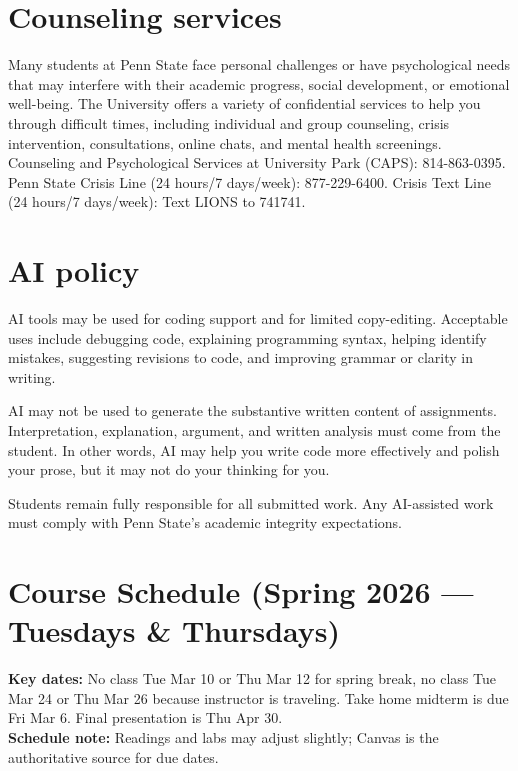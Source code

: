 \documentclass[letterpaper,11pt]{article}
\begin{document}
\section*{Counseling services}
Many students at Penn State face personal challenges or have psychological needs that may interfere with their academic progress, social development, or emotional well-being. The University offers a variety of confidential services to help you through difficult times, including individual and group counseling, crisis intervention, consultations, online chats, and mental health screenings. Counseling and Psychological Services at University Park (CAPS): 814-863-0395. Penn State Crisis Line (24 hours/7 days/week): 877-229-6400. Crisis Text Line (24 hours/7 days/week): Text LIONS to 741741.

\section*{AI policy}
AI tools may be used for coding support and for limited copy-editing. Acceptable uses include debugging code, explaining programming syntax, helping identify mistakes, suggesting revisions to code, and improving grammar or clarity in writing.\bigskip

\noindent AI may not be used to generate the substantive written content of assignments. Interpretation, explanation, argument, and written analysis must come from the student. In other words, AI may help you write code more effectively and polish your prose, but it may not do your thinking for you.\bigskip

\noindent Students remain fully responsible for all submitted work. Any AI-assisted work must comply with Penn State’s academic integrity expectations.


\section*{Course Schedule (Spring 2026 --- Tuesdays \& Thursdays)}
\noindent \textbf{Key dates:} No class Tue Mar 10 or Thu Mar 12 for spring break, no class Tue Mar 24 or Thu Mar 26 because instructor is traveling. Take home midterm is due Fri Mar 6. Final presentation is Thu Apr 30. \\
\noindent \textbf{Schedule note:} Readings and labs may adjust slightly; Canvas is the authoritative source for due dates.
\end{document}
